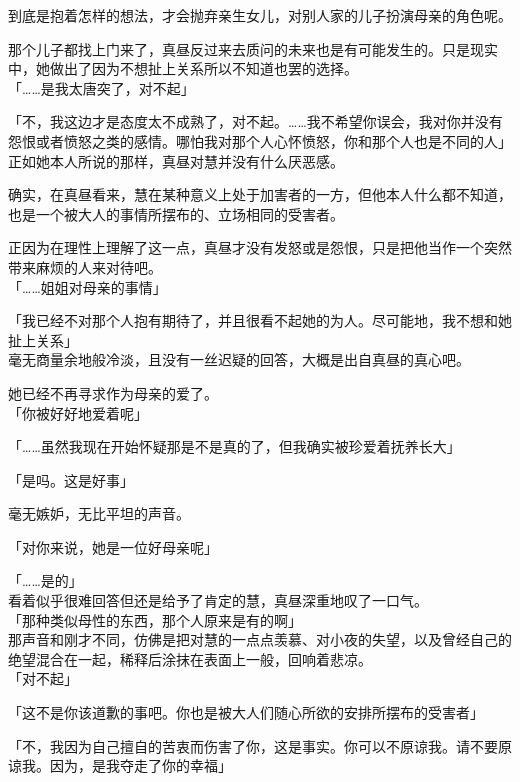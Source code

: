 到底是抱着怎样的想法，才会抛弃亲生女儿，对别人家的儿子扮演母亲的角色呢。

那个儿子都找上门来了，真昼反过来去质问的未来也是有可能发生的。只是现实中，她做出了因为不想扯上关系所以不知道也罢的选择。\\

「……是我太唐突了，对不起」

「不，我这边才是态度太不成熟了，对不起。……我不希望你误会，我对你并没有怨恨或者愤怒之类的感情。哪怕我对那个人心怀愤怒，你和那个人也是不同的人」\\

正如她本人所说的那样，真昼对慧并没有什么厌恶感。

确实，在真昼看来，慧在某种意义上处于加害者的一方，但他本人什么都不知道，也是一个被大人的事情所摆布的、立场相同的受害者。

正因为在理性上理解了这一点，真昼才没有发怒或是怨恨，只是把他当作一个突然带来麻烦的人来对待吧。\\

「……姐姐对母亲的事情」

「我已经不对那个人抱有期待了，并且很看不起她的为人。尽可能地，我不想和她扯上关系」\\

毫无商量余地般冷淡，且没有一丝迟疑的回答，大概是出自真昼的真心吧。

她已经不再寻求作为母亲的爱了。\\

「你被好好地爱着呢」

「……虽然我现在开始怀疑那是不是真的了，但我确实被珍爱着抚养长大」

「是吗。这是好事」

毫无嫉妒，无比平坦的声音。

「对你来说，她是一位好母亲呢」

「……是的」\\

看着似乎很难回答但还是给予了肯定的慧，真昼深重地叹了一口气。\\

「那种类似母性的东西，那个人原来是有的啊」\\

那声音和刚才不同，仿佛是把对慧的一点点羡慕、对小夜的失望，以及曾经自己的绝望混合在一起，稀释后涂抹在表面上一般，回响着悲凉。\\

「对不起」

「这不是你该道歉的事吧。你也是被大人们随心所欲的安排所摆布的受害者」

「不，我因为自己擅自的苦衷而伤害了你，这是事实。你可以不原谅我。请不要原谅我。因为，是我夺走了你的幸福」\\


